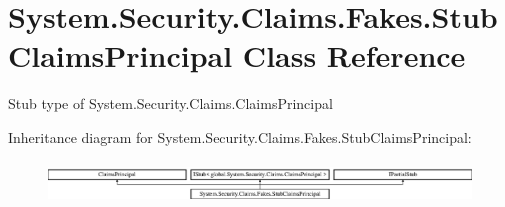 \hypertarget{class_system_1_1_security_1_1_claims_1_1_fakes_1_1_stub_claims_principal}{\section{System.\-Security.\-Claims.\-Fakes.\-Stub\-Claims\-Principal Class Reference}
\label{class_system_1_1_security_1_1_claims_1_1_fakes_1_1_stub_claims_principal}
}


Stub type of System.\-Security.\-Claims.\-Claims\-Principal 


Inheritance diagram for System.\-Security.\-Claims.\-Fakes.\-Stub\-Claims\-Principal\-:\begin{figure}[H]
\begin{center}
\leavevmode
\includegraphics[height=1.121121cm]{class_system_1_1_security_1_1_claims_1_1_fakes_1_1_stub_claims_principal}
\end{center}
\end{figure}
